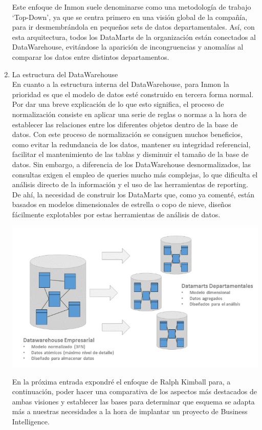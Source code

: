 \documentclass[preprint,12pt]{elsarticle}
\begin{document}
\begin{enumerate}[5.1]
Este enfoque de Inmon suele denominarse como una metodología de trabajo ‘Top-Down’, ya que se centra primero en una visión global de la compañía, para ir desmembrándola en pequeños sets de datos departamentales. Así, con esta arquitectura, todos los DataMarts de la organización están conectados al DataWarehouse, evitándose la aparición de incongruencias y anomalías al comparar los datos entre distintos departamentos.\\

   \item La estructura del DataWarehouse\\

En cuanto a la estructura interna del DataWarehouse, para Inmon la prioridad es que el modelo de datos esté construido en tercera forma normal. Por dar una breve explicación de lo que esto significa, el proceso de normalización consiste en aplicar una serie de reglas o normas a la hora de establecer las relaciones entre los diferentes objetos dentro de la base de datos. Con este proceso de normalización se consiguen muchos beneficios, como evitar la redundancia de los datos, mantener su integridad referencial, facilitar el mantenimiento de las tablas y disminuir el tamaño de la base de datos. Sin embargo, a diferencia de los DataWarehouse desnormalizados, las consultas exigen el empleo de queries mucho más complejas, lo que dificulta el análisis directo de la información y el uso de las herramientas de reporting. De ahí, la necesidad de construir los DataMarts que, como ya comenté, están basados en modelos dimensionales de estrella o copo de nieve, diseños fácilmente explotables por estas herramientas de análisis de datos.\\

\begin {center}
\includegraphics[scale= 1.80]{./Imagenes/img2.jpg}
\end {center}

En la próxima entrada expondré el enfoque de Ralph Kimball para, a continuación, poder hacer una comparativa de los aspectos más destacados de ambas visiones y establecer las bases para determinar que esquema se adapta más a nuestras necesidades a la hora de implantar un proyecto de Business Intelligence.

\end{enumerate}
\end{document}
